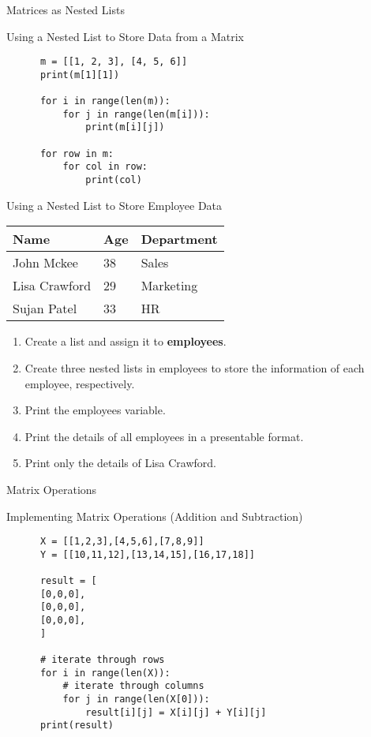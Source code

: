 \documentclass[../main.tex]{subfiles}
\begin{document}
\begin{frame}[fragile]{Matrices as Nested Lists}
  \begin{exercise}{Using a Nested List to Store Data from a Matrix}
    \begin{lstlisting}
      m = [[1, 2, 3], [4, 5, 6]]
      print(m[1][1])

      for i in range(len(m)):
          for j in range(len(m[i])):
              print(m[i][j])

      for row in m:
          for col in row:
              print(col)
    \end{lstlisting}
  \end{exercise}
\end{frame}
\begin{frameact}{Using a Nested List to Store Employee Data}

  {\centering
    \begin{tabular}{lll}
      \toprule
      Name          & Age & Department \\
      \midrule
      John Mckee    & 38  & Sales      \\
      Lisa Crawford & 29  & Marketing  \\
      Sujan Patel   & 33  & HR\\
      \bottomrule
    \end{tabular}
    \par}
  
  \begin{enumerate}
\item Create a list and assign it to \textbf{employees}.
\item Create three nested lists in employees to store the information of each employee, respectively.
\item Print the employees variable.
\item Print the details of all employees in a presentable format.
\item Print only the details of Lisa Crawford.
  \end{enumerate}
\end{frameact}

\begin{frame}[fragile]{Matrix Operations}
  \begin{exercise}{Implementing Matrix Operations (Addition and Subtraction)}
    \begin{lstlisting}
      X = [[1,2,3],[4,5,6],[7,8,9]]
      Y = [[10,11,12],[13,14,15],[16,17,18]]

      result = [
      [0,0,0],
      [0,0,0],
      [0,0,0],
      ]

      # iterate through rows
      for i in range(len(X)):      
          # iterate through columns
          for j in range(len(X[0])):
              result[i][j] = X[i][j] + Y[i][j]
      print(result)
    \end{lstlisting}
  \end{exercise}
\end{frame}
\end{document}
